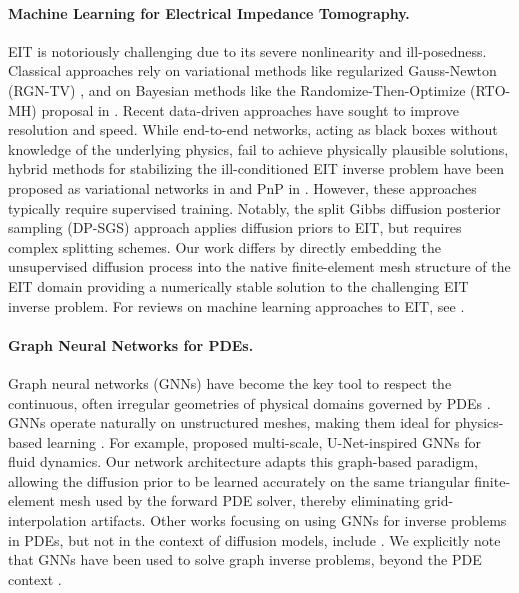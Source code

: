 \documentclass[a4paper,11pt]{article}
\theoremstyle{definition}
\theoremstyle{plain}
\theoremstyle{remark}
\begin{document}
\paragraph{Machine Learning for Electrical Impedance Tomography.}
EIT is notoriously challenging due to its severe nonlinearity and ill-posedness. Classical approaches rely on variational methods like regularized Gauss-Newton (RGN-TV) \cite{borsic2009vivo}, and on Bayesian methods like the Randomize-Then-Optimize (RTO-MH) proposal in \cite{bardsley2015randomize}. Recent data-driven approaches have sought to improve resolution and speed. While end-to-end networks, acting as black boxes without knowledge of the underlying physics, fail to achieve physically plausible solutions, hybrid methods for stabilizing the ill-conditioned EIT inverse problem have been proposed as variational networks in \cite{RGN2022} and PnP in \cite{Col2023DeepplugandplayPG}. However, these approaches typically require supervised training. 
Notably, the split Gibbs diffusion posterior sampling (DP-SGS) \cite{ling2025split} approach applies diffusion priors to EIT, but requires complex splitting schemes. Our work differs by directly embedding the unsupervised diffusion process into the native finite-element mesh structure of the EIT domain providing a numerically stable solution to the challenging EIT inverse problem. For reviews on machine learning approaches to EIT, see \cite{TanyuNingHauptmannJinMaass+2025+437+470,denker2025deep}.

\paragraph{Graph Neural Networks for PDEs.}
Graph neural networks (GNNs) have become the key tool to respect the continuous, often irregular geometries of physical domains governed by PDEs \cite{pfaff2021learning,eliasof-etal-2021}. GNNs operate naturally on unstructured meshes, making them ideal for physics-based learning \cite{Lazzaro2025APG}. For example,  \cite{Lino22,LINO2025} proposed multi-scale, U-Net-inspired GNNs for fluid dynamics. Our network architecture adapts this graph-based paradigm, allowing the diffusion prior to be learned accurately on the same triangular finite-element mesh used by the forward PDE solver, thereby eliminating grid-interpolation artifacts. Other works focusing on using GNNs for inverse problems in PDEs, but not in the context of diffusion models, include \cite{qzhao2022graphpde,lauga2025graph}. We explicitly note that GNNs have been used to solve graph inverse problems, beyond the PDE context \cite{eliasof2025learning}. 
\end{document}
